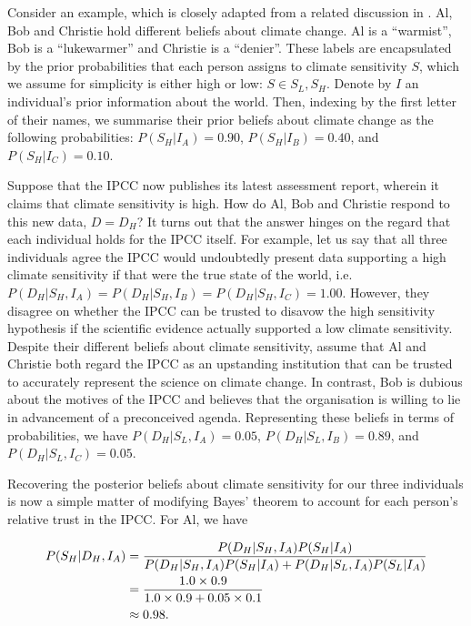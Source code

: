 \documentclass[smallextended]{svjour3}       %
\begin{document}
Consider an example, which is closely adapted from a related discussion
in \cite{jaynes2003probability}. Al, Bob and Christie hold different
beliefs about climate change. Al is a ``warmist'', Bob is a
``lukewarmer'' and Christie is a ``denier''. These labels are
encapsulated by the prior probabilities that each person assigns to
climate sensitivity \(S\), which we assume for simplicity is either high
or low: \(S \in {S_L, S_H}\). Denote by \(I\) an individual's prior
information about the world. Then, indexing by the first letter of their
names, we summarise their prior beliefs about climate change as the
following probabilities: \(P(S_H|I_A)=0.90\), \(P(S_H|I_B)=0.40\), and
\(P(S_H|I_C)=0.10\).

Suppose that the IPCC now publishes its latest assessment report,
wherein it claims that climate sensitivity is high. How do Al, Bob and
Christie respond to this new data, \(D=D_H\)? It turns out that the
answer hinges on the regard that each individual holds for the IPCC
itself. For example, let us say that all three individuals agree the
IPCC would undoubtedly present data supporting a high climate
sensitivity if that were the true state of the world,
i.e.~\(P(D_H|S_H,I_A) = P(D_H|S_H,I_B) = P(D_H|S_H,I_C) = 1.00\).
However, they disagree on whether the IPCC can be trusted to disavow the
high sensitivity hypothesis if the scientific evidence actually
supported a low climate sensitivity. Despite their different beliefs
about climate sensitivity, assume that Al and Christie both regard the
IPCC as an upstanding institution that can be trusted to accurately
represent the science on climate change. In contrast, Bob is dubious
about the motives of the IPCC and believes that the organisation is
willing to lie in advancement of a preconceived agenda. Representing
these beliefs in terms of probabilities, we have
\(P(D_H|S_L,I_A) = 0.05\), \(P(D_H|S_L,I_B) = 0.89\), and
\(P(D_H|S_L,I_C) = 0.05\).

Recovering the posterior beliefs about climate sensitivity for our three
individuals is now a simple matter of modifying Bayes' theorem to
account for each person's relative trust in the IPCC. For Al, we have

\begin{align}
     P(S_H|D_H,I_A) &= \frac{P(D_H|S_H,I_A)P(S_H|I_A)}{P(D_H|S_H,I_A)P(S_H|I_A) + P(D_H|S_L,I_A)P(S_L|I_A)} \notag \\
                                    &= \frac{1.0\times0.9}{1.0\times0.9 + 0.05\times0.1} \notag \\
                                    &\approx 0.98. \notag
\end{align}
\end{document}
